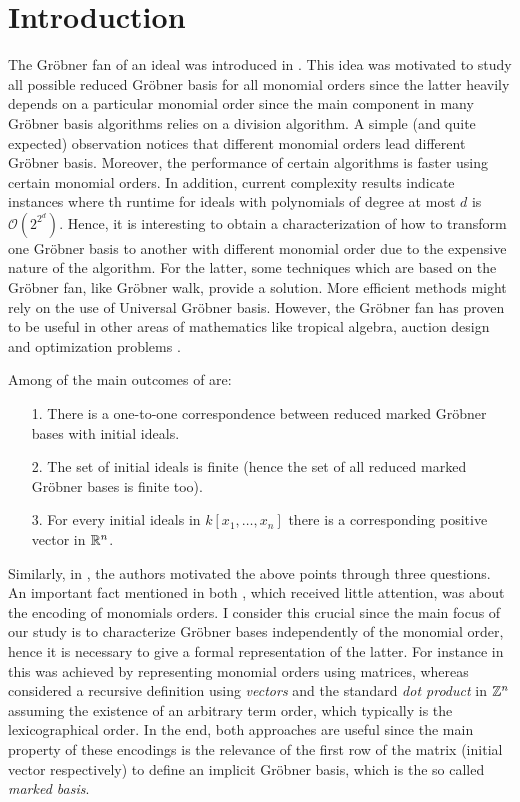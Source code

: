 \section{Introduction}

The Gr\"obner fan of an ideal was introduced in \cite{MORA1988183}.
This idea was motivated to study all possible reduced Gr\"obner
basis for all monomial orders since the latter heavily depends
on a particular monomial order \cite{Cox:2015:IVA:2821082}
since the main component in many Gr\"obner basis algorithms
relies on a division algorithm. A simple (and quite expected)
observation notices that different monomial orders lead
different Gr\"obner basis. Moreover, the performance of certain
algorithms is faster using certain monomial orders. In addition,
current complexity results \cite{MAYR1982305} indicate instances
where th runtime for ideals with polynomials of
degree at most $d$ is $\mathcal{O}(2^{2^d})$. Hence, it is interesting to
obtain a characterization of how to transform one Gr\"obner
basis to another with different monomial order due to the expensive
nature of the algorithm. For the latter,
some techniques which are based on the Gr\"obner fan, like Gr\"obner walk,
provide a solution. More efficient methods might rely on the use of
Universal Gr\"obner basis. However, the Gr\"obner fan has proven to
be useful in other areas of mathematics like tropical algebra, auction
design and optimization problems \cite{2014arXiv1408.0313K}.

Among of the main outcomes of \cite{MORA1988183} are:

\begin{itemize}
\item[1.] There is a one-to-one correspondence between reduced
  marked Gr\"obner bases with initial ideals.
\item[2.] The set of initial ideals is finite (hence the set of all
  reduced marked Gr\"obner bases is finite too).
\item[3.] For every initial ideals in $k[x_1, \dots, x_n]$
  there is a corresponding positive vector in $\mathbb{R}^n$.  
\end{itemize}

Similarly, in \cite{Cox:2014}, the authors motivated the above points
through three questions. An important fact mentioned
in both \cite{Cox:2014, SturmfelsGrobConv}, which received little attention,
was about the encoding of monomials orders. I consider this crucial since the
main focus of our study is to characterize Gr\"obner bases independently
of the monomial order, hence it is necessary to give a formal representation
of the latter. For instance in \cite{Cox:2014} this was achieved by
representing monomial orders using matrices, whereas \cite{SturmfelsGrobConv}
considered a recursive definition using \emph{vectors} and the standard \emph{dot product}
in $\mathbb{Z}^n$ assuming the existence of an arbitrary term order, which typically
is the lexicographical order. In the end, both approaches are useful
since the main property of these encodings is the relevance of the first
row of the matrix (initial vector respectively) to define an implicit
Gr\"obner basis, which is the so called \emph{marked \grob basis}.

